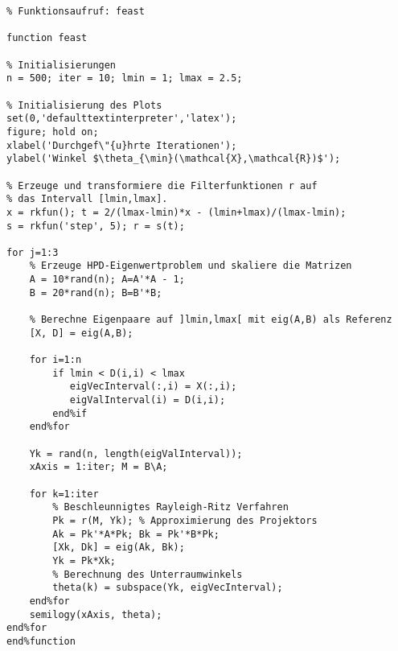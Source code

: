 \newpage

\begin{lstlisting}[caption=FEAST, captionpos=b, label=alg:appAlgorithm:FEAST]
% Eingabe: -; % Ausgabe: -
% Funktionsaufruf: feast

function feast

% Initialisierungen
n = 500; iter = 10; lmin = 1; lmax = 2.5;

% Initialisierung des Plots
set(0,'defaulttextinterpreter','latex');
figure; hold on;
xlabel('Durchgef\"{u}hrte Iterationen');
ylabel('Winkel $\theta_{\min}(\mathcal{X},\mathcal{R})$');

% Erzeuge und transformiere die Filterfunktionen r auf
% das Intervall [lmin,lmax].
x = rkfun(); t = 2/(lmax-lmin)*x - (lmin+lmax)/(lmax-lmin);
s = rkfun('step', 5); r = s(t);

for j=1:3
    % Erzeuge HPD-Eigenwertproblem und skaliere die Matrizen
    A = 10*rand(n); A=A'*A - 1;
    B = 20*rand(n); B=B'*B;

    % Berechne Eigenpaare auf ]lmin,lmax[ mit eig(A,B) als Referenz
    [X, D] = eig(A,B);

    for i=1:n
        if lmin < D(i,i) < lmax
           eigVecInterval(:,i) = X(:,i);
           eigValInterval(i) = D(i,i);
        end%if
    end%for

    Yk = rand(n, length(eigValInterval));
    xAxis = 1:iter; M = B\A;

    for k=1:iter
        % Beschleunnigtes Rayleigh-Ritz Verfahren
        Pk = r(M, Yk); % Approximierung des Projektors
        Ak = Pk'*A*Pk; Bk = Pk'*B*Pk;
        [Xk, Dk] = eig(Ak, Bk);
        Yk = Pk*Xk;
        % Berechnung des Unterraumwinkels
        theta(k) = subspace(Yk, eigVecInterval);
    end%for
    semilogy(xAxis, theta);
end%for
end%function

\end{lstlisting}
